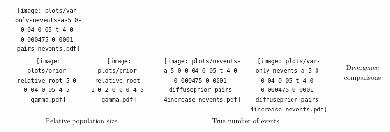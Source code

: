 \documentclass[border=10pt,varwidth=30cm]{standalone}
\begin{document}
\begin{figure}
\begin{tabular}{@{}cccccccc@{}}
        & \texttt{[image: plots/var-only-nevents-a-5\_0-0\_04-0\_05-t-4\_0-0\_000475-0\_0001-pairs-nevents.pdf]}
        & \multicolumn{1}{c|}{}
        & \\
        & \texttt{[image: plots/prior-relative-root-5\_0-0\_04-0\_05-4\_5-gamma.pdf]}
        & \texttt{[image: plots/prior-relative-root-1\_0-2\_0-0\_0-4\_5-gamma.pdf]}
        &
        & \texttt{[image: plots/nevents-a-5\_0-0\_04-0\_05-t-4\_0-0\_000475-0\_0001-diffuseprior-pairs-4increase-nevents.pdf]}
        & \texttt{[image: plots/var-only-nevents-a-5\_0-0\_04-0\_05-t-4\_0-0\_000475-0\_0001-diffuseprior-pairs-4increase-nevents.pdf]}
        & \multicolumn{1}{c|}{}
        & \multirow{5}{*}[16.5em]{\begin{sideways}\Large Divergence comparisons\end{sideways}} \\
        & \multicolumn{2}{c}{\large Relative population size}
        &
        & \multicolumn{2}{c}{\large True number of events}
        &
        & \\
    \end{tabular}
\end{figure}
\end{document}
